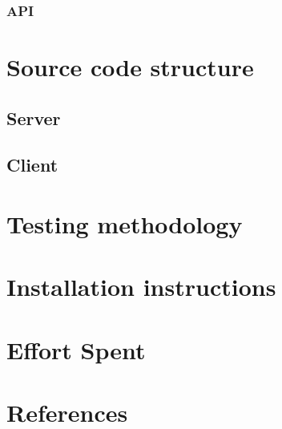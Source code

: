 	    \subsection{API}

\newpage
\chapter{Source code structure}
	\section{Server}
	\section{Client}
\newpage
\chapter{Testing methodology}
\newpage
\chapter{Installation instructions}
\newpage
\chapter{Effort Spent}
    
\chapter{References}
	


